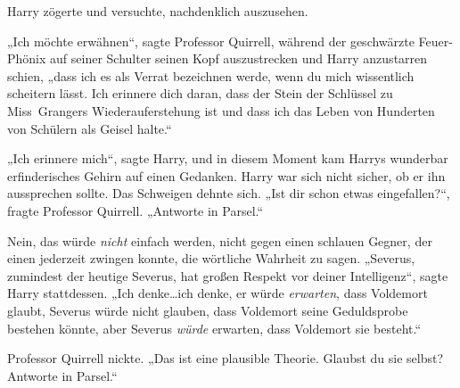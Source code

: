 Harry zögerte und versuchte, nachdenklich auszusehen.

„Ich möchte erwähnen“, sagte Professor Quirrell, während der geschwärzte Feuer-Phönix auf seiner Schulter seinen Kopf auszustrecken und Harry anzustarren schien,
„dass ich es als Verrat bezeichnen werde, wenn du mich wissentlich scheitern lässt. Ich erinnere dich daran, dass der Stein der Schlüssel zu Miss~Grangers Wiederauferstehung ist und dass ich das Leben von Hunderten von Schülern als Geisel halte.“

„Ich erinnere mich“, sagte Harry, und in diesem Moment kam Harrys wunderbar erfinderisches Gehirn auf einen Gedanken.
Harry war sich nicht sicher, ob er ihn aussprechen sollte.
Das Schweigen dehnte sich.
„Ist dir schon etwas eingefallen?“, fragte Professor Quirrell.
„Antworte in Parsel.“

Nein, das würde \emph{nicht} einfach werden, nicht gegen einen schlauen Gegner, der einen jederzeit zwingen konnte, die wörtliche Wahrheit zu sagen.
„Severus, zumindest der heutige Severus, hat großen Respekt vor deiner Intelligenz“, sagte Harry stattdessen.
„Ich denke…ich denke, er würde \emph{erwarten}, dass Voldemort glaubt, Severus würde nicht glauben, dass Voldemort seine Geduldsprobe bestehen könnte, aber Severus \emph{würde} erwarten, dass Voldemort sie besteht.“

Professor Quirrell nickte.
„Das ist eine plausible Theorie. Glaubst du sie selbst? Antworte in Parsel.“

